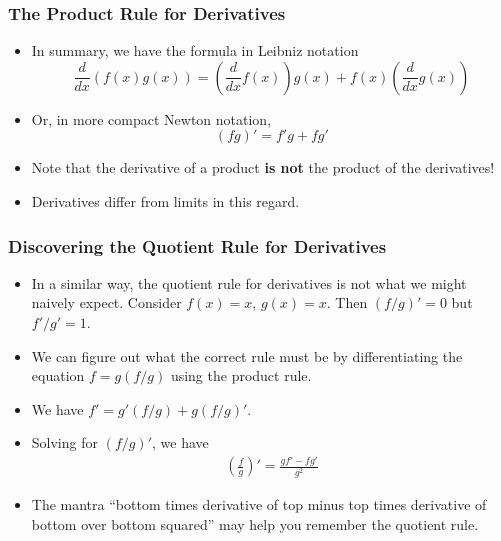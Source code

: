 \documentclass[serif,ignorenonframetext]{beamer}
\begin{document}
\begin{frame}
  \frametitle{The Product Rule for Derivatives}
  \begin{itemize}[<+->]
  \item In summary, we have the formula in Leibniz notation
    \begin{displaymath}
      \frac{d}{dx} \left(f(x)g(x)\right) 
      = \left(\frac{d}{dx} f(x)\right) g(x) 
      + f(x) \left(\frac{d}{dx} g(x) \right)
    \end{displaymath}
  \item Or, in more compact Newton notation,
    \begin{displaymath}
      (fg)' = f'g + fg'
    \end{displaymath}
  \item Note that the derivative of a product \textbf{is not} the product
    of the derivatives!
  \item Derivatives differ from limits in this regard.
  \end{itemize}
\end{frame}

\begin{frame}
  \frametitle{Discovering the Quotient Rule for Derivatives}
  \begin{itemize}[<+->]
  \item In a similar way, the quotient rule for derivatives is not what
    we might naively expect.  Consider $f(x)=x$, $g(x)=x$.  Then 
    $(f/g)'=0$ but $f'/g'=1$.
  \item We can figure out what the correct rule must be by differentiating
    the equation $f=g(f/g)$ using the product rule.
  \item We have $f'=g'(f/g) + g(f/g)'$.
  \item Solving for $(f/g)'$, we have
    \begin{align*}
      \left(\frac{f}{g}\right)'
      = \frac{gf'-fg'}{g^2}
    \end{align*}
  \item The mantra ``bottom times derivative of top minus top times derivative
    of bottom over bottom squared'' may help you remember the quotient rule.
  \end{itemize}
\end{frame}

\end{document}
